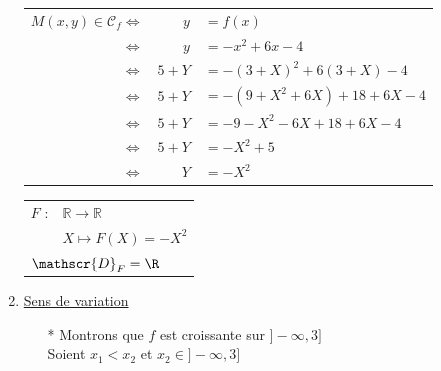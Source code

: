 \begin{enumerate}
\begin{tabular}{r@{$\;$}r@{$\;$}l}
$M(x,y) \in \mathscr{C}_f  
           \Longleftrightarrow $ & $ y $ & $= f(x) $\\
         $\Longleftrightarrow $ & $ y $ & $= -x^2 +6x -4$ \\
         $\Longleftrightarrow $ & $ 5 + Y  $ & $= -(3 + X)^2 + 6(3+X) -4$ \\        
         $\Longleftrightarrow $ & $ 5 + Y  $ & $= -(9 + X^2 +6X) +18 +6X  -4$ \\                
         $\Longleftrightarrow $ & $ 5 + Y  $ & $= -9 - X^2 - 6X +18 +6X  -4$ \\                
         $\Longleftrightarrow $ & $ 5 + Y  $ & $= - X^2 + 5$ \\         
         $\Longleftrightarrow $ & $  Y  $ & $= - X^2 $ \\    
\end{tabular}

\begin{tabular}{l@{$\;$ }l}
 $F$ : & $ \mathbb{R} \longrightarrow \mathbb{R}$\\
        & $ X \longmapsto F(X) = -X^2$ \\
\multicolumn{2}{l}{$\mathscr{D}_{F} = \R $ }       \\
\end{tabular}
 
\samepage
 
 \newpage
 \item \underline{Sens de variation}

\begin{itemize}

\item [*] Montrons que $f$ est croissante sur $]-\infty, 3]$ \\

Soient $x_1 < x_2$   et  $x_2 \in ] -\infty, 3]$ \\


\end{itemize}
\end{enumerate}

